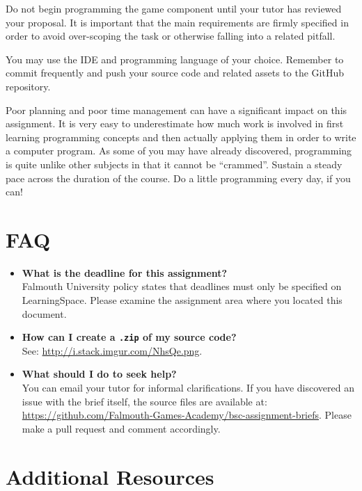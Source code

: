 \documentclass{../fal_assignment}
\begin{document}
Do not begin programming the game component until your tutor has reviewed your proposal. It is important that the main requirements are firmly specified in order to avoid over-scoping the task or otherwise falling into a related pitfall.

You may use the IDE and programming language of your choice. Remember to commit frequently and push your source code and related assets to the GitHub repository.

Poor planning and poor time management can have a significant impact on this assignment. It is very easy to underestimate how much work is involved in first learning programming concepts and then actually applying them in order to write a computer program. As some of you may have already discovered, programming is quite unlike other subjects in that it cannot be ``crammed''. Sustain a steady pace across the duration of the course. Do a little programming every day, if you can!

\section*{FAQ}

\begin{itemize}
	\item 	\textbf{What is the deadline for this assignment?} \\ 
    		Falmouth University policy states that deadlines must only be specified on LearningSpace. Please examine the assignment area where you located this document.
    		
    	\item 	\textbf{How can I create a \texttt{.zip} of my source code?} \\ 
    		See: \url{http://i.stack.imgur.com/NhsQe.png}. 
    		
	\item 	\textbf{What should I do to seek help?} \\ 
    		You can email your tutor for informal clarifications. If you have discovered an issue with the brief itself, the source files are available at: 
    		\url{https://github.com/Falmouth-Games-Academy/bsc-assignment-briefs}. Please make a pull request and comment accordingly.
\end{itemize}

\section*{Additional Resources}
\end{document}
